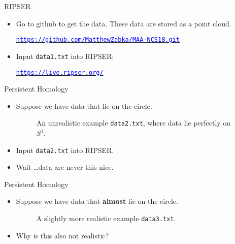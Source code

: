 \begin{frame}{RIPSER}
\begin{center}
\end{center}
\begin{itemize}
\item<1-> Go to github to get the data. These data are stored as a point cloud.
\begin{center}
\hyperref[https://github.com/MatthewZabka/MAA-NCS18.git]{\textcolor{blue}{\texttt{https://github.com/MatthewZabka/MAA-NCS18.git}}}
\end{center}
\item<2-> Input \texttt{data1.txt} into RIPSER:
\begin{center}
\hyperref[https://live.ripser.org/]{\textcolor{blue}{\texttt{https://live.ripser.org/}}}
\end{center}
\end{itemize}
\end{frame}
\begin{frame}{Persistent Homology}
\begin{itemize}
\item<1-> Suppose we have data that lie on the circle.
\begin{center}
\begin{figure}
\caption{An unrealistic example \texttt{data2.txt}, where data lie perfectly on $S^1$.}
\end{figure}
\end{center}
\item<2-> Input \texttt{data2.txt} into RIPSER.
\item<2-> Wait \ldots data are never this nice.
\end{itemize}
\end{frame}
\begin{frame}{Persistent Homology}
\begin{itemize}
\item<1-> Suppose we have data that \textbf{almost} lie on the circle.
\begin{center}
\begin{figure}
\caption{A slightly more realistic example \texttt{data3.txt}.}
\end{figure}
\end{center}
\item<2-> Why is this also not realistic?
\end{itemize}
\end{frame}
